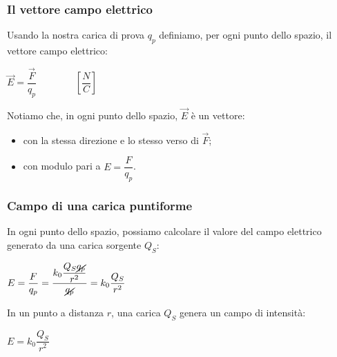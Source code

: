 \documentclass[handout]{beamer}
\theoremstyle{plain}
\begin{document}
\begin{frame}
\frametitle{Il vettore campo elettrico}
\begin{figure}
\end{figure}
Usando la nostra carica di prova $ q_p $ definiamo, per ogni punto dello spazio, il \alert{vettore campo elettrico}:

\begin{center}
\colorbox{blue!30}{$ \vec{E} = \dfrac{\vec{F}}{q_p} $}~~~~~~~~$ \left[\dfrac{N}{C}\right] $
\end{center}\pause
Notiamo che, in ogni punto dello spazio, \alert{$ \vec{E} $ è un vettore}:
\begin{itemize}
  \item con la stessa direzione e lo stesso verso di $ \vec{F} $;\pause
  \item con modulo pari a $ E = \dfrac{F}{q_p} $.
\end{itemize}
\end{frame}

\begin{frame}
\frametitle{Campo di una carica puntiforme}
In ogni punto dello spazio, possiamo calcolare il valore del campo elettrico generato da una carica sorgente $ Q_S $:
\begin{center}
$ E = \dfrac{F}{q_p} = \dfrac{k_0 \dfrac{Q_S \cancel{q_p}}{r^2}}{\cancel{q_p}} = k_0 \dfrac{Q_S }{r^2} $
\end{center}\pause
In un punto a distanza $ r $, una carica $ Q_S $ genera un campo di intensità:
\begin{center}
\colorbox{blue!30}{$ E = k_0 \dfrac{Q_S}{r^2} $}
\end{center}
\end{frame}
\end{document}
